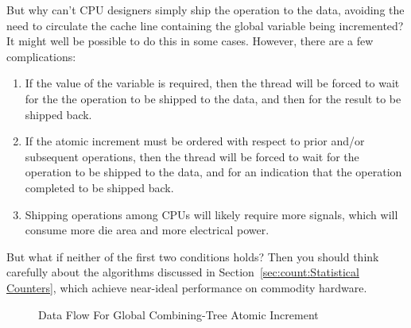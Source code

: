 \QuickQ{}
	But why can't CPU designers simply ship the operation to the
	data, avoiding the need to circulate the cache line containing
	the global variable being incremented?
\QuickA{}
	It might well be possible to do this in some cases.
	However, there are a few complications:
	\begin{enumerate}
	\item	If the value of the variable is required, then the
		thread will be forced to wait for the the operation
		to be shipped to the data, and then for the result
		to be shipped back.
	\item	If the atomic increment must be ordered with respect
		to prior and/or subsequent operations, then the thread
		will be forced to wait for the operation to be shipped
		to the data, and for an indication that the operation
		completed to be shipped back.
	\item	Shipping operations among CPUs will likely require
		more signals, which will consume more die area and
		more electrical power.
	\end{enumerate}
	But what if neither of the first two conditions holds?
	Then you should think carefully about the algorithms discussed
	in Section~\ref{sec:count:Statistical Counters}, which achieve
	near-ideal performance on commodity hardware.

\begin{figure}[tb]
\begin{center}
\end{center}
\caption{Data Flow For Global Combining-Tree Atomic Increment}
\label{fig:count:Data Flow For Global Combining-Tree Atomic Increment}
\end{figure}

